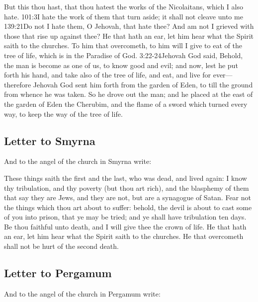But this thou hast, that thou hatest the works of the Nicolaitans, which I also hate.%
			{101:3}{I hate the work of them that turn aside; it shall not cleave unto me}%
			{139:21}{Do not I hate them, O Jehovah, that hate thee? And am not I grieved with those that rise up against thee?} %
He that hath an ear, let him hear what the Spirit saith to the churches. To him that overcometh, to him will I give to eat of the tree of life, which is in the Paradise of God.%
				{3:22-24}{Jehovah God said, Behold, the man is become as one of us, to know good and evil; and now, lest he put forth his hand, and take also of the tree of life, and eat, and live for ever— therefore Jehovah God sent him forth from the garden of Eden, to till the ground from whence he was taken. So he drove out the man; and he placed at the east of the garden of Eden the Cherubim, and the flame of a sword which turned every way, to keep the way of the tree of life.}
\subsection*{Letter to Smyrna}
And to the angel of the church in Smyrna write:

These things saith the first and the last, who was dead, and lived again: %
I know thy tribulation, and thy poverty (but thou art rich), and the blasphemy of them that say they are Jews, and they are not, but are a synagogue of Satan. %
Fear not the things which thou art about to suffer: behold, the devil is about to cast some of you into prison, that ye may be tried; and ye shall have tribulation ten days.%
Be thou faithful unto death, and I will give thee the crown of life. %
He that hath an ear, let him hear what the Spirit saith to the churches. He that overcometh shall not be hurt of the second death.
\subsection*{Letter to Pergamum}
And to the angel of the church in Pergamum write:


